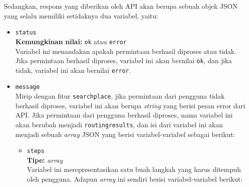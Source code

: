 \vspace{\baselineskip}
Sedangkan, respons yang diberikan oleh API akan berupa sebuah objek JSON yang selalu memiliki setidaknya dua variabel, yaitu:

\begin{itemize}
	\item \verb|status|\\
	\textbf{Kemungkinan nilai:} \verb|ok| atau \verb|error|\\
	Variabel ini menandakan apakah permintaan berhasil diproses atau tidak. Jika permintaan berhasil diproses, variabel ini akan bernilai \verb|ok|, dan jika tidak, variabel ini akan bernilai \verb|error|.
	\item \verb|message|\\
	Mirip dengan fitur \verb|searchplace|, jika permintaan dari pengguna tidak berhasil diproses, variabel ini akan berupa \textit{string} yang berisi pesan error dari API. Jika permintaan dari pengguna berhasil diproses, nama variabel ini akan berubah menjadi \verb|routingresults|, dan isi dari variabel ini akan menjadi sebuah \textit{array} JSON yang berisi variabel-variabel sebagai berikut:
	\begin{itemize}
		\item \verb|steps|\\
		\textbf{Tipe:} \textit{array}\\
		Variabel ini merepresentasikan satu buah langkah yang harus ditempuh oleh pengguna. Adapun \textit{array} ini sendiri berisi variabel-variabel berikut:
		

\end{itemize}
\end{itemize}

